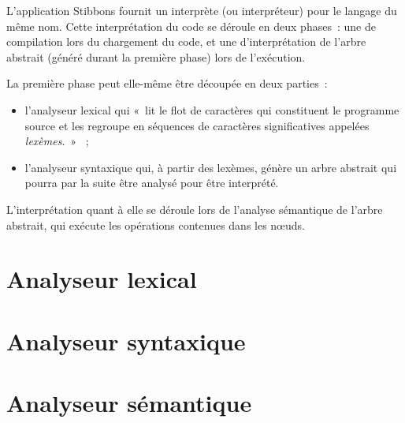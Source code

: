 L'application Stibbons fournit un interprète (ou interpréteur) pour le langage du même nom. Cette interprétation du code se déroule en deux phases~: une de compilation lors du chargement du code, et une d'interprétation de l'arbre abstrait (généré durant la première phase) lors de l'exécution.

La première phase peut elle-même être découpée en deux parties~:
\begin{itemize}
\item l'analyseur lexical qui «~lit le flot de caractères qui constituent le programme source et les regroupe en séquences de caractères significatives appelées \emph{lexèmes}.~» \cite{compilateurs}~;
\item l'analyseur syntaxique qui, à partir des lexèmes, génère un arbre abstrait qui pourra par la suite être analysé pour être interprété.
\end{itemize}

L'interprétation quant à elle se déroule lors de l'analyse sémantique de l'arbre abstrait, qui exécute les opérations contenues dans les nœuds.

\section{Analyseur lexical}
\label{analyse-lexicale}


\section{Analyseur syntaxique}
\label{analyse-syntaxique}


\section{Analyseur sémantique}
\label{analyse-semantique}

